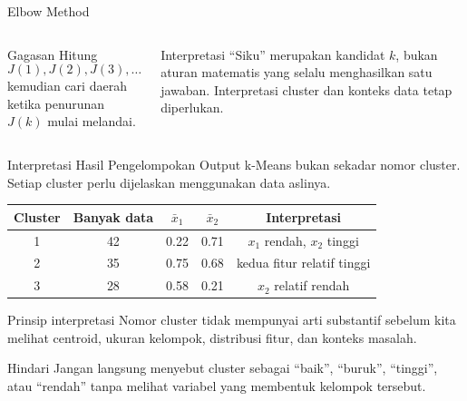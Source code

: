 \documentclass[aspectratio=169,11pt]{beamer}
\newcommand{\sumber}[1]{%
  \par\vspace{.6mm}{\tiny\color{DarkText!75} Sumber: #1}
}
\begin{document}
\begin{frame}{Elbow Method}
\begin{columns}[T]
\centering
{}

\small
\begin{block}{Gagasan}
Hitung
\[
J(1),J(2),J(3),\ldots
\]
kemudian cari daerah ketika penurunan $J(k)$ mulai melandai.
\end{block}

\begin{alertblock}{Interpretasi}
\footnotesize
``Siku'' merupakan kandidat $k$, bukan aturan matematis yang selalu menghasilkan satu jawaban. Interpretasi cluster dan konteks data tetap diperlukan.
\end{alertblock}
\end{columns}
\sumber{James et al. (2021), \S12.4.}
\end{frame}

\begin{frame}{Interpretasi Hasil Pengelompokan}
\small
Output k-Means bukan sekadar nomor cluster. Setiap cluster perlu dijelaskan menggunakan data aslinya.

\begin{center}
\begin{tabular}{c c c c c}
\toprule
Cluster & Banyak data & $\bar x_1$ & $\bar x_2$ & Interpretasi \\
\midrule
1 & 42 & 0.22 & 0.71 & $x_1$ rendah, $x_2$ tinggi \\
2 & 35 & 0.75 & 0.68 & kedua fitur relatif tinggi \\
3 & 28 & 0.58 & 0.21 & $x_2$ relatif rendah \\
\bottomrule
\end{tabular}
\end{center}

\begin{block}{Prinsip interpretasi}
\small
Nomor cluster tidak mempunyai arti substantif sebelum kita melihat centroid, ukuran kelompok, distribusi fitur, dan konteks masalah.
\end{block}

\begin{alertblock}{Hindari}
\footnotesize
Jangan langsung menyebut cluster sebagai ``baik'', ``buruk'', ``tinggi'', atau ``rendah'' tanpa melihat variabel yang membentuk kelompok tersebut.
\end{alertblock}
\end{frame}
\end{document}
